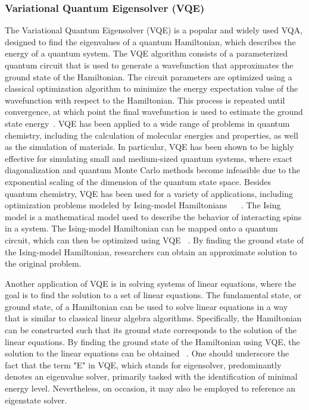 \subsubsection{Variational Quantum Eigensolver (VQE)}
The Variational Quantum Eigensolver (VQE) is a popular and widely used VQA, designed to find the eigenvalues of a quantum Hamiltonian,
which describes the energy of a quantum system. The VQE algorithm consists of a parameterized quantum circuit that is used to generate a
wavefunction that approximates the ground state of the Hamiltonian. The circuit parameters are optimized using a classical optimization
algorithm to minimize the energy expectation value of the wavefunction with respect to the Hamiltonian. This process is repeated until convergence,
at which point the final wavefunction is used to estimate the ground state energy~\cite{peruzzo2014variational}.
VQE has been applied to a wide range of problems in quantum chemistry, including the calculation of molecular energies
and properties, as well as the simulation of materials. In particular, VQE has been shown to be highly effective for
simulating small and medium-sized quantum systems, where exact diagonalization and quantum Monte Carlo methods become infeasible
due to the exponential scaling of the dimension of the quantum state space.
Besides quantum chemistry, VQE has been used for a variety of applications, including optimization problems modeled by
Ising-model Hamiltonians ~\cite{moll2018introduction} ~\cite{lucas2014ising}.
The Ising model is a mathematical model used to describe the behavior of interacting spins in a system.
The Ising-model Hamiltonian can be mapped onto a quantum circuit, which can then be optimized using VQE ~\cite{moll2018introduction}.
By finding the ground state of the Ising-model Hamiltonian, researchers can obtain an approximate solution to the original problem.

Another application of VQE is in solving systems of linear equations, where the goal is to find the solution to a set
of linear equations. The fundamental state, or ground state, of a Hamiltonian can be used to solve linear equations
in a way that is similar to classical linear algebra algorithms. Specifically, the Hamiltonian can be constructed
such that its ground state corresponds to the solution of the linear equations. By finding the ground state of the
Hamiltonian using VQE, the solution to the linear equations can be obtained ~\cite{harrow2009quantum}.
One should underscore the fact that the term "E" in VQE, which stands for eigensolver,
predominantly denotes an eigenvalue solver, primarily tasked with the identification of minimal energy level.
Nevertheless, on occasion, it may also be employed to reference an eigenstate solver.

